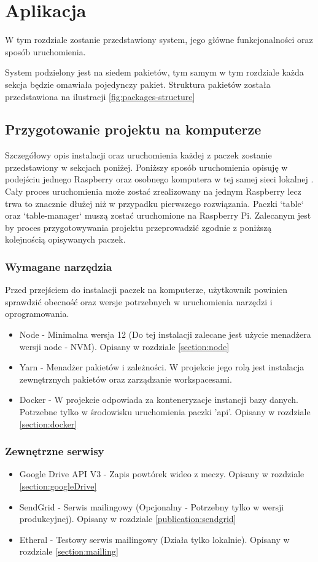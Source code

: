 \chapter{Aplikacja}
\label{ch:application}
W tym rozdziale zostanie przedstawiony system, jego główne funkcjonalności oraz sposób uruchomienia.

System podzielony jest na siedem pakietów, tym samym w tym rozdziale każda sekcja będzie omawiała pojedynczy pakiet. Struktura pakietów została przedstawiona na ilustracji \ref{fig:packages-structure}

\section{Przygotowanie projektu na komputerze}
Szczegółowy opis instalacji oraz uruchomienia każdej z paczek zostanie przedstawiony w sekcjach poniżej.
Poniższy sposób uruchomienia opisuję w podejściu jednego Raspberry oraz osobnego komputera w tej samej sieci lokalnej . Cały proces uruchomienia może zostać zrealizowany na jednym Raspberry lecz trwa to znacznie dłużej niż w przypadku pierwszego rozwiązania. Paczki `table` oraz `table-manager` muszą zostać uruchomione na Raspberry Pi. Zalecanym jest by proces przygotowywania projektu przeprowadzić zgodnie z poniższą kolejnością opisywanych paczek.

\subsection{Wymagane narzędzia}
Przed przejściem do instalacji paczek na komputerze, użytkownik powinien sprawdzić obecność oraz wersje potrzebnych w uruchomienia narzędzi i oprogramowania.

\begin{itemize}
	\item Node - Minimalna wersja 12 (Do tej instalacji zalecane jest użycie menadżera wersji node - NVM). Opisany w rozdziale \ref{section:node}
	\item Yarn - Menadżer pakietów i zależności. W projekcie jego rolą jest instalacja zewnętrznych pakietów oraz zarządzanie workspacesami.
	\item Docker - W projekcie odpowiada za konteneryzacje instancji bazy danych. Potrzebne tylko w środowisku uruchomienia paczki 'api'. Opisany w rozdziale \ref{section:docker}
\end{itemize}

\label{subsection:externalServices}
\subsection{Zewnętrzne serwisy}
\begin{itemize}
	\item Google Drive API V3 - Zapis powtórek wideo z meczy. Opisany w rozdziale \ref{section:googleDrive}
	\item SendGrid - Serwis mailingowy (Opcjonalny - Potrzebny tylko w wersji produkcyjnej). Opisany w rozdziale \ref{publication:sendgrid}
	\item Etheral - Testowy serwis mailingowy (Działa tylko lokalnie). Opisany w rozdziale \ref{section:mailling}
\end{itemize}

